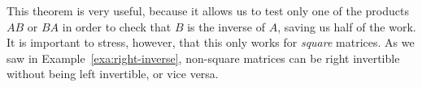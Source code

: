 This theorem is very useful, because it allows us to test only one of
the products $AB$ or $BA$ in order to check that $B$ is the inverse of
$A$, saving us half of the work. It is important to stress, however,
that this only works for {\em square} matrices. As we saw in
Example~\ref{exa:right-inverse}, non-square matrices can be right
invertible without being left invertible, or vice versa. 


